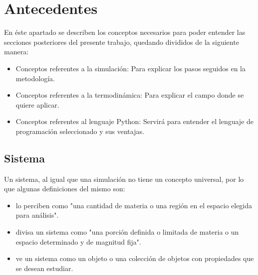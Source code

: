 \section{Antecedentes}



 
En éste apartado se describen los conceptos necesarios para poder entender las secciones posteriores del presente trabajo, quedando divididos de la siguiente manera:


\begin{itemize}
    \item Conceptos referentes a la simulación: Para explicar los pasos seguidos en la metodología.
    \item Conceptos referentes a la termodinámica: Para explicar el campo donde se quiere aplicar.
    \item Conceptos referentes al lenguaje Python: Servirá para entender el lenguaje de programación seleccionado y sus ventajas.
\end{itemize}

\subsection{Sistema}

Un sistema, al igual que una simulación no tiene un concepto universal, por lo que algunas definiciones del mismo son:

\begin{itemize}
    \item \textcite{ccengel2006termodinamica} lo perciben como "una cantidad de materia o una región en el espacio elegida para análisis".
    \item \textcite{burghardt1984ingenieria} divisa un sistema como "una porción definida o limitada de materia o un espacio determinado y de magnitud fija".
    \item \textcite{fritzonsim} ve un sistema como un objeto o una colección de objetos con propiedades que se desean estudiar.
\end{itemize}



